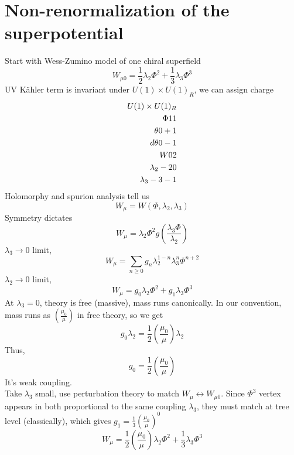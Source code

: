 \documentclass[type = bachelor]{fduthesis-en}
\begin{document}
\section{Non-renormalization of the superpotential}
Start with Wess-Zumino model of one chiral superfield
\begin{equation}
W_{\mu0}=\frac{1}{2}\lambda_2\Phi^2+\frac{1}{3}\lambda_3\Phi^3
\end{equation}
UV K\"{a}hler term is invariant under $U(1)\times U(1)_R$, we can assign charge
\begin{align}
\notag U(1)\times U(1)_R\\
\notag \Phi 1 1\\
\theta 0 +1\\
d\theta 0 -1\\
W 0 2\\
\lambda_2 -2 0\\
\lambda_3 -3 -1
\end{align}
Holomorphy and spurion analysis tell us 
\begin{equation}
W_\mu=W(\Phi, \lambda_2, \lambda_3)
\end{equation}
Symmetry dictates
\begin{equation}
W_\mu=\lambda_2\Phi^2g(\frac{\lambda_3\Phi}{\lambda_2})
\end{equation}
$\lambda_3\rightarrow0$ limit,
\begin{equation}
W_\mu=\sum_{n\geq0}g_n\lambda_2^{1-n}\lambda_3^n\Phi^{n+2}
\end{equation}
$\lambda_2\rightarrow0$ limit,
\begin{equation}
W_\mu=g_0\lambda_2\Phi^2+g_1\lambda_3\Phi^3
\end{equation}
At $\lambda_3=0$, theory is free (massive), mass runs canonically. In our convention, mass runs as $(\frac{\mu_0}{\mu})$ in free theory, so we get
\begin{equation}
g_0\lambda_2=\frac{1}{2}(\frac{\mu_0}{\mu})\lambda_2
\end{equation}
Thus,
\begin{equation}
g_0=\frac{1}{2}(\frac{\mu_0}{\mu}) 
\end{equation}
It's weak coupling.\\
Take $\lambda_3$ small, use perturbation theory to match $W_\mu\leftrightarrow W_{\mu0}$. Since $\Phi^3$ vertex appears in both proportional to the same coupling $\lambda_3$, they must match at tree level (classically), which gives $g_1=\frac{1}{3}(\frac{\mu_0}{\mu})^0$
\begin{equation}
W_\mu=\frac{1}{2}(\frac{\mu_0}{\mu})\lambda_2\Phi^2+\frac{1}{3}\lambda_3\Phi^3
\end{equation}
\end{document}
